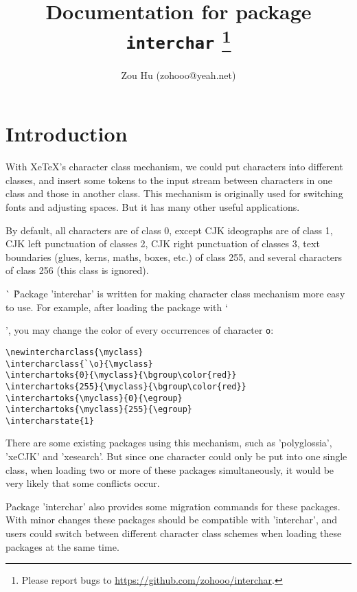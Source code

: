 \documentclass{article}
\begin{document}
\title{Documentation for package \texttt{interchar}
\footnote{Please report bugs to \url{https://github.com/zohooo/interchar}.}}
\author{Zou Hu (zohooo@yeah.net)}
\maketitle
\tableofcontents

\section{Introduction}

With XeTeX\rq s character class mechanism, we could put characters into different classes,
and insert some tokens to the input stream between characters in one class and those in
another class. This mechanism is originally used for switching fonts and adjusting spaces.
But it has many other useful applications.

By default, all characters are of class 0, except CJK ideographs are of class 1, CJK left
punctuation of classes 2, CJK right punctuation of classes 3, text boundaries (glues, kerns,
maths, boxes, etc.) of class 255, and several characters of class 256 (this class is ignored).

\MakeNormal\`
\newintercharclass{\myclass}
\MakeActive\`
Package 'interchar' is written for making character class mechanism more easy to use. For example,
after loading the package with `\usepackage{interchar}', you may change the color of every
occurrences of character \texttt{o}:
\begin{verbatim}
\newintercharclass{\myclass}
\intercharclass{`\o}{\myclass}
\interchartoks{0}{\myclass}{\bgroup\color{red}}
\interchartoks{255}{\myclass}{\bgroup\color{red}}
\interchartoks{\myclass}{0}{\egroup}
\interchartoks{\myclass}{255}{\egroup}
\intercharstate{1}
\end{verbatim}

There are some existing packages using this mechanism, such as 'polyglossia', 'xeCJK' and
'xesearch'. But since one character could only be put into one single class, when loading two
or more of these packages simultaneously, it would be very likely that some conflicts occur.

Package 'interchar' also provides some migration commands for these packages. With minor changes
these packages should be compatible with 'interchar', and users could switch between different
character class schemes when loading these packages at the same time.
\end{document}
